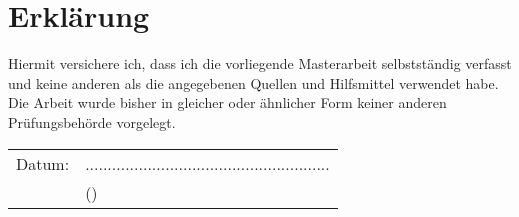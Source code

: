 \chapter*{Erklärung}
	
	\normalsize Hiermit versichere ich, dass ich die vorliegende Masterarbeit selbstständig verfasst und keine anderen als die angegebenen Quellen und Hilfsmittel verwendet  habe. Die Arbeit wurde bisher in gleicher oder ähnlicher Form keiner anderen Prüfungsbehörde vorgelegt.

    \vspace{2cm}

	\begin{tabular}{p{15em}p{15em}}
		Datum: &  .......................................................\\
			   & \centering (\studentName)\\
	\end{tabular}


